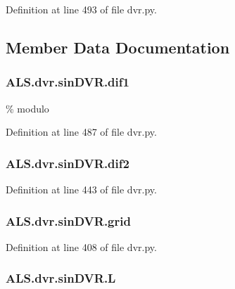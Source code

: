 Definition at line 493 of file dvr.\+py.



\subsection{Member Data Documentation}
\hypertarget{class_a_l_s_1_1dvr_1_1sin_d_v_r_a98dd8b3cf96285a244df8aaececad513}{
\subsubsection[{dif1}]{\setlength{\rightskip}{0pt plus 5cm}A\+L\+S.\+dvr.\+sin\+D\+V\+R.\+dif1}}\label{class_a_l_s_1_1dvr_1_1sin_d_v_r_a98dd8b3cf96285a244df8aaececad513}


\% modulo 



Definition at line 487 of file dvr.\+py.

\hypertarget{class_a_l_s_1_1dvr_1_1sin_d_v_r_a32687413b0d38869ee8ec7b4e56ff283}{
\subsubsection[{dif2}]{\setlength{\rightskip}{0pt plus 5cm}A\+L\+S.\+dvr.\+sin\+D\+V\+R.\+dif2}}\label{class_a_l_s_1_1dvr_1_1sin_d_v_r_a32687413b0d38869ee8ec7b4e56ff283}


Definition at line 443 of file dvr.\+py.

\hypertarget{class_a_l_s_1_1dvr_1_1sin_d_v_r_aa2bfbf09f3802c12a7dea88bcb12fd13}{
\subsubsection[{grid}]{\setlength{\rightskip}{0pt plus 5cm}A\+L\+S.\+dvr.\+sin\+D\+V\+R.\+grid}}\label{class_a_l_s_1_1dvr_1_1sin_d_v_r_aa2bfbf09f3802c12a7dea88bcb12fd13}


Definition at line 408 of file dvr.\+py.

\hypertarget{class_a_l_s_1_1dvr_1_1sin_d_v_r_a765a9f901719aac9c36b40fdd066abfe}{
\subsubsection[{L}]{\setlength{\rightskip}{0pt plus 5cm}A\+L\+S.\+dvr.\+sin\+D\+V\+R.\+L}}\label{class_a_l_s_1_1dvr_1_1sin_d_v_r_a765a9f901719aac9c36b40fdd066abfe}


